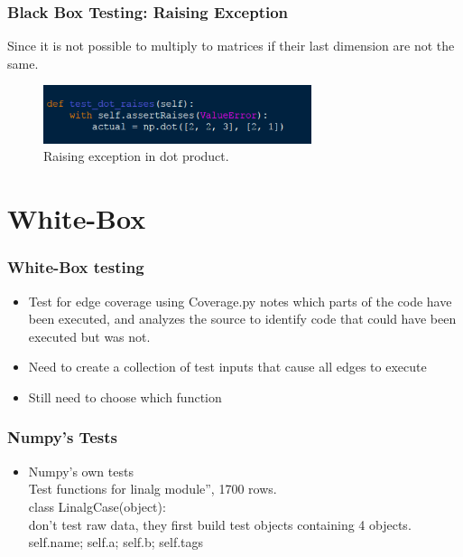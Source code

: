 \documentclass{beamer}
\begin{document}
\begin{frame}\frametitle{Black Box Testing: Raising Exception} 
Since it is not possible to multiply to matrices if their last dimension are not the same.
\begin{figure}[h]
	\centering
	\includegraphics[width=0.70\textwidth]{images/raises.png}
	\caption{Raising exception in dot product.}
	\label{fig:rai}
\end{figure}
\end{frame}


\section{White-Box}
\begin{frame}\frametitle{White-Box testing} 
\begin{itemize}
\item Test for edge coverage using Coverage.py
 notes which parts of the code have been executed, and analyzes the source to identify code that could have been executed but was not.
\item Need to create a collection of test inputs that cause all edges to execute
\item Still need to choose which function
\end{itemize}
\end{frame}

\begin{frame}\frametitle{Numpy's Tests}
\begin{itemize}
	\item Numpy’s own tests
	\\ Test functions for linalg module”, 1700 rows. 
	\\ class LinalgCase(object):
	\\ don’t test raw data, they first build test objects containing 4 objects. 
	\\ self.name; self.a; self.b; self.tags  
\end{itemize}
\end{frame}
\end{document}
